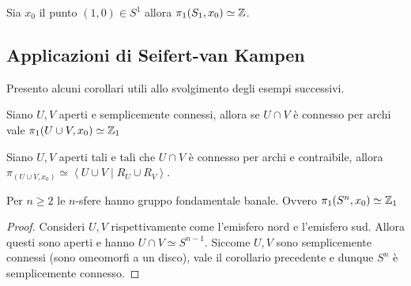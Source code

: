 \begin{theorem}
	Sia $x_0$ il punto $(1,0) \in S^1$ allora $\pi_1(S_1, x_0) \simeq \mathbb{Z}$.
\end{theorem}



\subsection{\textcolor{TopAlg}{\textbf{Applicazioni di Seifert-van Kampen}}}
Presento alcuni corollari utili allo svolgimento degli esempi successivi.

\begin{corollary}
	Siano $U,V$ aperti e semplicemente connessi, allora se $U \cap V$ è connesso per archi vale $\pi_1(U\cup V,x_0) \simeq \mathbb{Z}_1$ 
\end{corollary}

\begin{corollary}
	Siano $U,V$ aperti tali e tali che $U \cap V$ è connesso per archi e contraibile, allora $\pi_(U \cup V, x_0) \simeq \left\langle U \cup V \mid R_U \cup R_V\right\rangle$.
\end{corollary}


\begin{xca}
	Per $n \ge 2$ le $n$-sfere hanno gruppo fondamentale banale. Ovvero $\pi_1(S^n, x_0) \simeq \mathbb{Z}_1$
\end{xca}
\begin{proof}
	Consideri $U,V$ rispettivamente come l'emisfero nord e l'emisfero sud. Allora questi sono aperti e hanno $U \cap V \simeq S^{n-1}$. Siccome $U, V$ sono semplicemente connessi (sono omeomorfi a un disco), vale il corollario precedente e dunque $S^n$ è semplicemente connesso.  
\end{proof}

